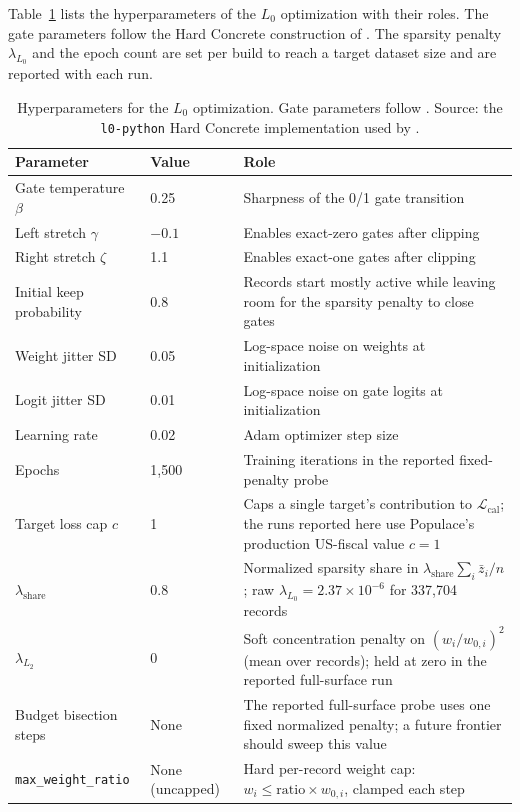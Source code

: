 Table~\ref{tab:hyperparameters_full} lists the hyperparameters of the $L_0$ optimization with their
roles. The gate parameters follow the Hard Concrete construction of \citet{louizos2018}. The
sparsity penalty $\lambda_{L_0}$ and the epoch count are set per build to reach a target dataset
size and are reported with each run.

\begin{table}[H]
\centering
{\tablefont
\begin{tabular}{@{}l l p{}@{}}
\toprule
Parameter & Value & Role \\
\midrule
Gate temperature $\beta$ & 0.25 & Sharpness of the 0/1 gate transition \\
Left stretch $\gamma$ & $-0.1$ & Enables exact-zero gates after clipping \\
Right stretch $\zeta$ & 1.1 & Enables exact-one gates after clipping \\
Initial keep probability & 0.8 & Records start mostly active while leaving room for the sparsity penalty to close gates \\
Weight jitter SD & 0.05 & Log-space noise on weights at initialization \\
Logit jitter SD & 0.01 & Log-space noise on gate logits at initialization \\
Learning rate & 0.02 & Adam optimizer step size \\
Epochs & 1{,}500 & Training iterations in the reported fixed-penalty probe \\
Target loss cap $c$ & 1 & Caps a single target's contribution to $\mathcal{L}_{\text{cal}}$; the runs reported here use Populace's production US-fiscal value $c=1$ \\
$\lambda_{\mathrm{share}}$ & 0.8 & Normalized sparsity share in $\lambda_{\mathrm{share}}\sum_i\bar{z}_i/n$; raw $\lambda_{L_0}=2.37\times10^{-6}$ for 337{,}704 records \\
$\lambda_{L_2}$ & $0$ & Soft concentration penalty on $(w_i/w_{0,i})^2$ (mean over records); held at zero in the reported full-surface run \\
Budget bisection steps & None & The reported full-surface probe uses one fixed normalized penalty; a future frontier should sweep this value \\
\texttt{max\_weight\_ratio} & None (uncapped) & Hard per-record weight cap: $w_i \leq \text{ratio}\times w_{0,i}$, clamped each step \\
\bottomrule
\end{tabular}
}
\caption{Hyperparameters for the $L_0$ optimization. Gate parameters follow \citet{louizos2018}.
Source: the \texttt{l0-python} Hard Concrete implementation used by \populace{}.}
\label{tab:hyperparameters_full}
\end{table}

